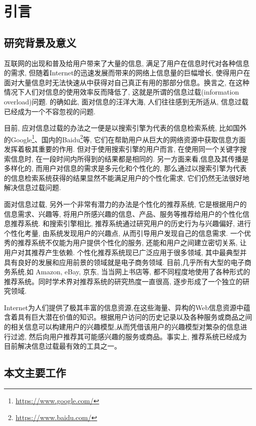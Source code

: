 \section{引言}

\subsection{研究背景及意义}

互联网的出现和普及给用户带来了大量的信息, 满足了用户在信息时代对各种信息的需求, 但随着Internet的迅速发展而带来的网络上信息量的巨幅增长, 使得用户在面对大量信息时无法快速从中获得对自己真正有用的那部分信息。换言之, 在这种情况下人们对信息的使用效率反而降低了, 这就是所谓的信息过载(information overload)问题. 的确如此, 面对信息的汪洋大海, 人们往往感到无所适从, 信息过载已经成为一个不容忽视的问题.

目前, 应对信息过载的办法之一便是以搜索引擎为代表的信息检索系统, 比如国外的Google\footnote{\url{https://www.google.com/}}、国内的Baidu\footnote{\url{https://www.baidu.com/}}等, 它们在帮助用户从巨大的网络资源中获取信息方面发挥着极其重要的作用. 但对于使用搜索引擎的用户而言, 在使用同一个关键字搜索信息时, 在一段时间内所得到的结果都是相同的. 另一方面来看,信息及其传播是多样化的, 而用户对信息的需求是多元化和个性化的, 那么通过以搜索引擎为代表的信息检索系统获得的结果显然不能满足用户的个性化需求, 它们仍然无法很好地解决信息过载问题.

面对信息过载, 另外一个非常有潜力的办法是个性化的推荐系统, 它是根据用户的信息需求、兴趣等, 将用户所感兴趣的信息、产品、服务等推荐给用户的个性化信息推荐系统. 和搜索引擎相比, 推荐系统通过研究用户的历史行为与兴趣偏好, 进行个性化考量, 由系统发现用户的兴趣点, 从而引导用户发现自己的信息需求. 一个优秀的推荐系统不仅能为用户提供个性化的服务, 还能和用户之间建立密切关系, 让用户对其推荐产生依赖. 个性化推荐系统现已广泛应用于很多领域, 其中最典型并具有良好的发展和应用前景的领域就是电子商务领域. 目前,几乎所有大型的电子商务系统,如 Amazon, eBay, 京东, 当当网上书店等, 都不同程度地使用了各种形式的推荐系统。同时学术界对推荐系统的研究热度一直很高, 逐步形成了一个独立的研究领域.

Internet为人们提供了极其丰富的信息资源,在这些海量、异构的Web信息资源中蕴含着具有巨大潜在价值的知识。根据用户访问的历史记录以及各种服务或商品之间的相关信息可以构建用户的兴趣模型,从而凭借该用户的兴趣模型对繁杂的信息进行过滤, 然后向用户推荐其可能感兴趣的服务或商品。事实上, 推荐系统已经成为目前解决信息过载最有效的工具之一。




\subsection{本文主要工作}

